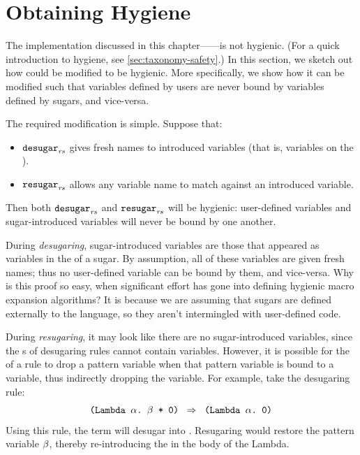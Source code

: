 \section{Obtaining Hygiene}
\label{sec:reval-hygiene}

The implementation discussed in this chapter---{\Resugarer}---is not
hygienic. (For a quick introduction to hygiene, see
\cref{sec:taxonomy-safety}.) In this section, we sketch out how {\Resugarer}
could be modified to be hygienic. More specifically, we show how it
can be modified such that variables defined by users are never bound
by variables defined by sugars, and vice-versa.

The required modification is simple. Suppose that:
\begin{itemize}[noitemsep]
  \item $\textnormal{\texttt{desugar}}_{\mathit{rs}}$ gives fresh names to introduced variables (that
    is, variables on the ).
  \item $\textnormal{\texttt{resugar}}_{\mathit{rs}}$ allows any variable name to match against an
    introduced variable.
\end{itemize}
Then both $\textnormal{\texttt{desugar}}_{\mathit{rs}}$ and $\textnormal{\texttt{resugar}}_{\mathit{rs}}$ will be hygienic:
user-defined variables and sugar-introduced variables will never be
bound by one another.

During \emph{desugaring}, sugar-introduced variables are those that
appeared as variables in the  of a sugar. By assumption, all
of these variables are given fresh names; thus no user-defined
variable can be bound by them, and vice-versa. Why is this proof so
easy, when significant effort has gone into defining hygienic macro
expansion algorithms? It is because we are assuming that sugars are
defined externally to the language, so they aren't intermingled with
user-defined code.

During \emph{resugaring}, it may look like there are no
sugar-introduced variables, since the s of desugaring rules
cannot contain variables. However, it is possible for the  of
a rule to drop a pattern variable when that pattern variable is bound
to a variable, thus indirectly dropping the variable. For example,
take the desugaring rule:
\[\texttt{(Lambda $\alpha$.\ $\beta$ * 0)}\;\;\Rightarrow\;\;\texttt{(Lambda $\alpha$.\ 0)}\]
Using this rule, the term  will desugar into
. Resugaring would restore the pattern
variable $\beta$, thereby re-introducing the  in the body of
the Lambda.

